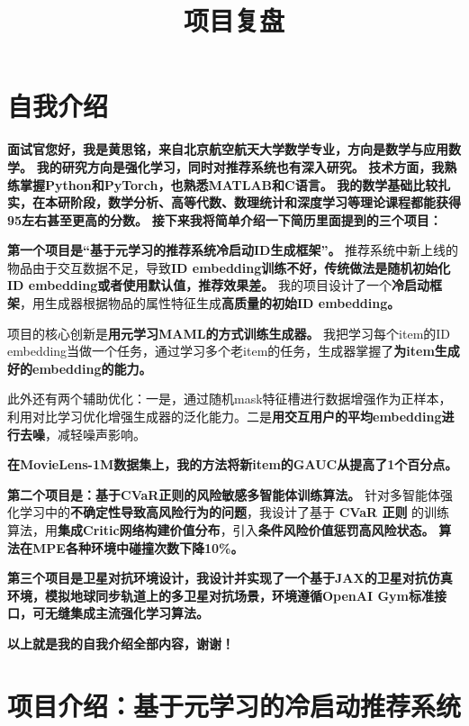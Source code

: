 \documentclass[UTF8]{ctexart}
\title{项目复盘}
\author{}
\date{}
\begin{document}
\maketitle

\section{自我介绍}
{\large
\textbf{面试官您好，我是黄思铭，来自北京航空航天大学数学专业，方向是数学与应用数学。} \textbf{我的研究方向是强化学习，同时对推荐系统也有深入研究。} \textbf{技术方面，我熟练掌握Python和PyTorch，也熟悉MATLAB和C语言。} \textbf{我的数学基础比较扎实，在本研阶段，数学分析、高等代数、数理统计和深度学习等理论课程都能获得95左右甚至更高的分数。} \textbf{接下来我将简单介绍一下简历里面提到的三个项目：}

\textbf{第一个项目是“基于元学习的推荐系统冷启动ID生成框架”。} 推荐系统中新上线的物品由于交互数据不足，导致\textbf{ID embedding训练不好，传统做法是随机初始化ID embedding或者使用默认值，推荐效果差。} 我的项目设计了一个\textbf{冷启动框架}，用生成器根据物品的属性特征生成\textbf{高质量的初始ID embedding。}

项目的核心创新是\textbf{用元学习MAML的方式训练生成器。} 我把学习每个item的ID embedding当做一个任务，通过学习多个老item的任务，生成器掌握了\textbf{为item生成好的embedding的能力。}

此外还有两个辅助优化：一是，通过随机mask特征槽进行数据增强作为正样本，利用对比学习优化增强生成器的泛化能力。二是\textbf{用交互用户的平均embedding进行去噪}，减轻噪声影响。

\textbf{在MovieLens-1M数据集上，我的方法将新item的GAUC从提高了1个百分点。}

\textbf{第二个项目是：基于CVaR正则的风险敏感多智能体训练算法。} 针对多智能体强化学习中的\textbf{不确定性导致高风险行为的问题}，我设计了基于 \textbf{CVaR 正则} 的训练算法，用\textbf{集成Critic网络构建价值分布}，引入\textbf{条件风险价值惩罚高风险状态。} \textbf{算法在MPE各种环境中碰撞次数下降10\%。}

\textbf{第三个项目是卫星对抗环境设计，我设计并实现了一个基于JAX的卫星对抗仿真环境，模拟地球同步轨道上的多卫星对抗场景，环境遵循OpenAI Gym标准接口，可无缝集成主流强化学习算法。}

\textbf{以上就是我的自我介绍全部内容，谢谢！}
}

\newpage


\section{项目介绍：基于元学习的冷启动推荐系统}
\end{document}
